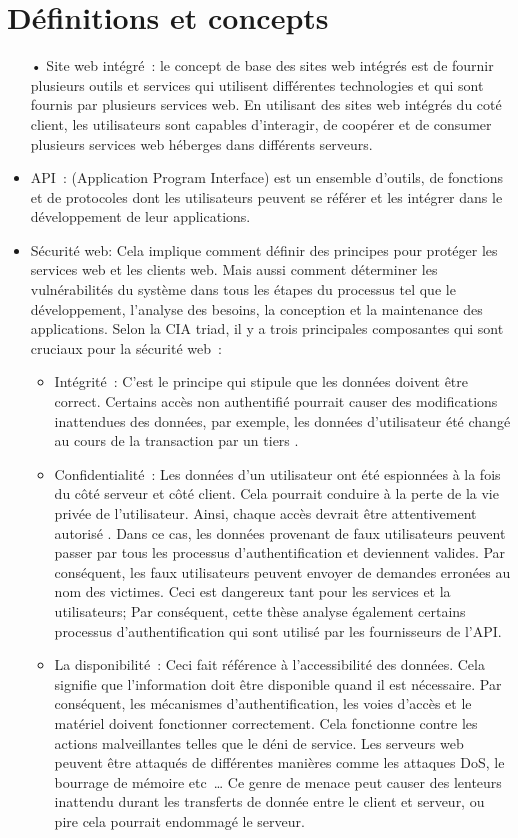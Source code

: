 \section{Définitions et concepts}
\begin{itemize}
\item[•]  Site web intégré : le concept de base des sites web intégrés est de fournir plusieurs outils et services qui utilisent différentes technologies et qui sont fournis par plusieurs services web. En utilisant des sites web intégrés du coté client, les utilisateurs sont capables d'interagir, de coopérer et de consumer plusieurs services web héberges dans différents serveurs.

\item  API : (Application Program Interface)  est un ensemble d'outils,  de fonctions et de protocoles dont les utilisateurs peuvent se référer et les intégrer dans le développement de leur applications.

\item  Sécurité web: Cela implique comment définir des principes pour protéger les services web et les clients web. Mais aussi comment déterminer les vulnérabilités du  système dans tous les étapes du processus tel que le développement, l'analyse des besoins, la conception et la maintenance des applications. Selon la CIA triad, il y a trois principales composantes qui sont cruciaux pour la sécurité web :
 \begin{itemize}
 \item Intégrité : C'est le principe qui stipule que les données doivent être correct. Certains accès non authentifié pourrait causer des modifications inattendues des données, par exemple, les données d'utilisateur été changé au cours de la transaction par un tiers \cite{2}. 
 \item Confidentialité : Les données d'un utilisateur ont été espionnées à la fois du côté serveur et côté client. Cela pourrait conduire à la perte de la vie privée de l'utilisateur. Ainsi, chaque accès devrait être attentivement  autorisé \cite{9}. Dans ce cas, les données provenant de faux utilisateurs  peuvent passer par tous les processus d'authentification et deviennent valides. Par conséquent, les faux utilisateurs peuvent envoyer de demandes erronées au nom des victimes. Ceci est dangereux tant pour les services et la utilisateurs; Par conséquent, cette thèse analyse également certains processus d'authentification qui sont utilisé par les fournisseurs de l'API.
 \item La disponibilité : Ceci fait référence à l'accessibilité des données. Cela signifie que l'information doit être disponible quand il est nécessaire. Par conséquent, les mécanismes d'authentification, les voies d'accès et le matériel doivent fonctionner correctement. Cela fonctionne contre les actions malveillantes telles que le déni de service. Les serveurs web peuvent être attaqués de différentes manières comme les attaques DoS, le bourrage de mémoire etc … Ce genre de menace peut causer des lenteurs inattendu durant les transferts de donnée entre le client et serveur, ou pire cela pourrait endommagé le serveur.
 \end{itemize}
\end{itemize}
